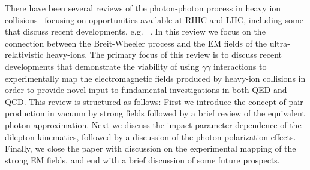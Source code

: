 \documentclass[twocolumn,epjc3]{svjour3}\sloppy
\begin{document}
There have been several reviews of the photon-photon process in heavy ion collisions~\cite{baurElectronPositronPairProduction2007a,baltzPhysicsUltraperipheralCollisions2008,brodskyHighEnergyPhotonphoton1995,baurCoherentPhotonphotonProcesses1993a} focusing on opportunities available at RHIC and LHC, including some that discuss recent developments, e.g. ~\cite{kleinPhotonuclearTwoPhotonInteractions2020}. 
In this review we focus on the connection between the Breit-Wheeler process and the EM fields of the ultra-relativistic heavy-ions. 
The primary focus of this review is to discuss recent developments that demonstrate the viability of using $\gamma\gamma$ interactions to experimentally map the electromagnetic fields produced by heavy-ion collisions in order to provide novel input to fundamental investigations in both QED and QCD. 
This review is structured as follows: First we introduce the concept of pair production in vacuum by strong fields followed by a brief review of the equivalent photon approximation. Next we discuss the impact parameter dependence of the dilepton kinematics, followed by a discussion of the photon polarization effects. Finally, we close the paper with discussion on the experimental mapping of the strong EM fields, and end with a brief discussion of some future prospects.
\end{document}
